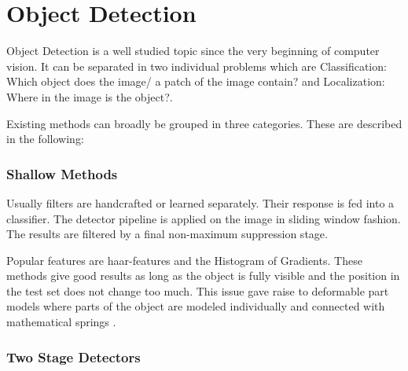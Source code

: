 	\section{Object Detection}
	\label{sec:bg:object_detection}
	Object Detection is a well studied topic since the very beginning of computer vision. It can be separated in two individual problems which are Classification: Which object does the image/ a patch of the image contain? and Localization: Where in the image is the object?.
	
	Existing methods can broadly be grouped in three categories. These are described in the following:

	\subsubsection{Shallow Methods}
	
	Usually filters are handcrafted or learned separately. Their response is fed into a classifier. The detector pipeline is applied on the image in sliding window fashion. The results are filtered by a final non-maximum suppression stage. 
	
	Popular features are haar-features \cite{Viola2004} and the Histogram of Gradients\cite{Forsyth}. These methods give good results as long as the object is fully visible and the position in the test set does not change too much. This issue gave raise to deformable part models where parts of the object are modeled individually and connected with mathematical springs \cite{Viola2004}.
	

	\subsubsection{Two Stage Detectors}
	
